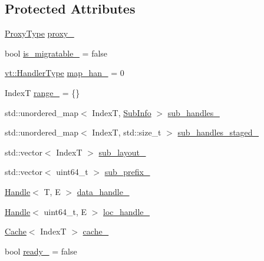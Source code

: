 \subsection*{Protected Attributes}
\begin{DoxyCompactItemize}
\item 
\hyperlink{structvt_1_1rdma_1_1_sub_handle_a758bee2e499658cfef92ace83eea6590}{Proxy\+Type} \hyperlink{structvt_1_1rdma_1_1_sub_handle_a10a5a6554a57910351679c93432af59e}{proxy\+\_\+}
\item 
bool \hyperlink{structvt_1_1rdma_1_1_sub_handle_a2e2fe2ff0da95f9b228d4f0d3cf5b3ce}{is\+\_\+migratable\+\_\+} = false
\item 
\hyperlink{namespacevt_af64846b57dfcaf104da3ef6967917573}{vt\+::\+Handler\+Type} \hyperlink{structvt_1_1rdma_1_1_sub_handle_a5ecf30f3c569bbfe574df42843cf0059}{map\+\_\+han\+\_\+} = 0
\item 
IndexT \hyperlink{structvt_1_1rdma_1_1_sub_handle_a7545e2edae28878b31bfc7bccadc0171}{range\+\_\+} = \{\}
\item 
std\+::unordered\+\_\+map$<$ IndexT, \hyperlink{structvt_1_1rdma_1_1_sub_handle_1_1_sub_info}{Sub\+Info} $>$ \hyperlink{structvt_1_1rdma_1_1_sub_handle_ae5300cda983bbb530edff53b377a71a8}{sub\+\_\+handles\+\_\+}
\item 
std\+::unordered\+\_\+map$<$ IndexT, std\+::size\+\_\+t $>$ \hyperlink{structvt_1_1rdma_1_1_sub_handle_a5643ad6c60d3cf3478bc9d16dfe72489}{sub\+\_\+handles\+\_\+staged\+\_\+}
\item 
std\+::vector$<$ IndexT $>$ \hyperlink{structvt_1_1rdma_1_1_sub_handle_aefa1426200c59256792c6e048d28d162}{sub\+\_\+layout\+\_\+}
\item 
std\+::vector$<$ uint64\+\_\+t $>$ \hyperlink{structvt_1_1rdma_1_1_sub_handle_a964f4cb2857f1d970253f89ad5bb708c}{sub\+\_\+prefix\+\_\+}
\item 
\hyperlink{structvt_1_1rdma_1_1_handle}{Handle}$<$ T, E $>$ \hyperlink{structvt_1_1rdma_1_1_sub_handle_a9d6fa87336ed3a1f7e3167f1e44c07b2}{data\+\_\+handle\+\_\+}
\item 
\hyperlink{structvt_1_1rdma_1_1_handle}{Handle}$<$ uint64\+\_\+t, E $>$ \hyperlink{structvt_1_1rdma_1_1_sub_handle_a2283d4e38954f446ae4a76ccfae5f19b}{loc\+\_\+handle\+\_\+}
\item 
\hyperlink{structvt_1_1rdma_1_1_cache}{Cache}$<$ IndexT $>$ \hyperlink{structvt_1_1rdma_1_1_sub_handle_aa4d5fc9bb2240a72af8af9164e1d8bf3}{cache\+\_\+}
\item 
bool \hyperlink{structvt_1_1rdma_1_1_sub_handle_a17f367f36559b48d0f18ec869e4ded8c}{ready\+\_\+} = false

\end{DoxyCompactItemize}
